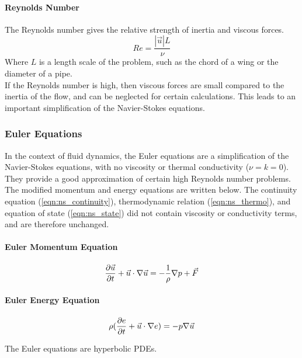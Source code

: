\documentclass[paper=a4, fontsize=11pt]{scrartcl}
\numberwithin{equation}{section}        %
\numberwithin{figure}{section}          %
\numberwithin{table}{section}               %
\begin{document}
\paragraph{Reynolds Number}
The Reynolds number gives the relative strength of inertia and viscous forces.
\begin{equation}
    Re = \frac{|\vec{u}| L}{\nu}
\end{equation}
Where $L$ is a length scale of the problem, such as the chord of a wing or the diameter of a pipe.\\
If the Reynolds number is high, then viscous forces are small compared to the inertia of the flow, and can be neglected for certain calculations. This leads to an important simplification of the Navier-Stokes equations.

\subsubsection{Euler Equations}
In the context of fluid dynamics, the Euler equations are a simplification of the Navier-Stokes equations, with no viscosity or thermal conductivity ($\nu = k = 0$). They provide a good approximation of certain high Reynolds number problems. The modified momentum and energy equations are written below. The continuity equation (\ref{eqn:ns_continuity}), thermodynamic relation (\ref{eqn:ns_thermo}), and equation of state (\ref{eqn:ns_state}) did not contain viscosity or conductivity terms, and are therefore unchanged.  

\paragraph{Euler Momentum Equation}
\begin{equation}
    \pdv{\vec{u}}{t} + \vec{u} \cdot \nabla \vec{u} = - \frac{1}{\rho} \nabla p + \vec{F}
\end{equation}

\paragraph{Euler Energy Equation}
\begin{equation}
    \rho(\pdv{e}{t} + \vec{u} \cdot \nabla e) = - p \nabla \vec{u}
\end{equation}

The Euler equations are hyperbolic PDEs.
\end{document}
